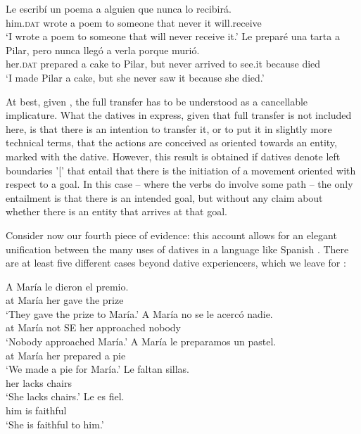 \documentclass[output=paper,colorlinks,citecolor=brown,nonflat]{./langscibook}
\begin{document}
\ea%
    \label{ex:fabregas:23}
    \ea\label{ex:fabregas:23a}
    \gll    Le escribí un poema a alguien que nunca lo recibirá.\\
            {him.}\textsc{dat} {wrote} {a} {poem} {to} {someone} {that} {never} {it} {will.receive}\\
    \glt `I wrote a poem to someone that will never receive it.'
    \ex\label{ex:fabregas:23b}
    \gll    Le preparé una tarta a Pilar, pero nunca llegó a verla porque murió.\\
            {her.}\textsc{dat}   {prepared} {a} {cake} {to} {Pilar,} {but}  {never}  {arrived} {to} {see.it} {because} {died}\\
    \glt `I made Pilar a cake, but she never saw it because she died.'
    \z
\z

At best, given , the full transfer has to be understood as a cancellable implicature. What the datives in  express, given that full transfer is not included here, is that there is an intention to transfer it, or to put it in slightly more technical terms, that the actions are conceived as oriented towards an entity, marked with the dative. However, this result is obtained if datives denote left boundaries '[' that entail that there is the initiation of a movement oriented with respect to a goal. In this case – where the verbs do involve some path – the only entailment is that there is an intended goal, but without any claim about whether there is an entity that arrives at that goal.

Consider now our fourth piece of evidence: this account allows for an elegant unification between the many uses of datives in a language like Spanish \citep{RAEASALE2009}. There are at least five different cases beyond dative experiencers, which we leave for :

\ea%
    \label{ex:fabregas:24}
    \ea\label{ex:fabregas:24a}
    \gll    A María le     dieron el   premio.\\
            {at} {María} {her}   {gave}    {the}  {prize}\\
    \glt `They gave the prize to María.' 
    \ex\label{ex:fabregas:24b}
    \gll    A María  no  se  le   acercó      nadie.\\
            {at} {María} {not} {SE} {her} {approached} {nobody}\\
    \glt `Nobody approached María.'
    \ex\label{ex:fabregas:24c}
    \gll    A María  le   preparamos un pastel.\\
            {at} {María} {her}   {prepared}      {a}   {pie}\\
    \glt `We made a pie for María.'
    \ex\label{ex:fabregas:24d}
    \gll    Le  faltan sillas.\\
            {her} {lacks}  {chairs}\\
    \glt `She lacks chairs.'
    \ex\label{ex:fabregas:24e}
    \gll    Le   es fiel.\\
            {him} {is}  {faithful}\\
    \glt `She is faithful to him.'
    \z
\z
\end{document}
